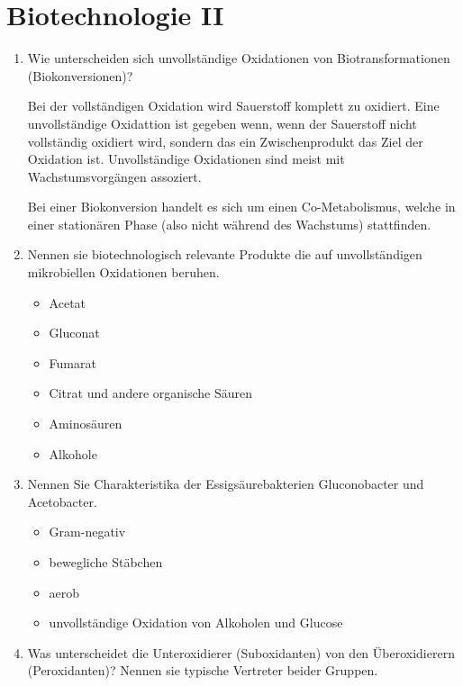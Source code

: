 
\section{Biotechnologie II}
\begin{enumerate}
	\item Wie unterscheiden sich unvollständige Oxidationen von Biotransformationen (Biokonversionen)?
		
		Bei der vollständigen Oxidation wird Sauerstoff komplett zu  oxidiert.
		Eine unvollständige Oxidattion ist gegeben wenn,
		wenn der Sauerstoff nicht vollständig oxidiert wird,
		sondern das ein Zwischenprodukt das Ziel der Oxidation ist.
		Unvollständige Oxidationen sind meist mit Wachstumsvorgängen assoziert.
		
		Bei einer Biokonversion handelt es sich um einen Co-Metabolismus,
		welche in einer stationären Phase (also nicht während des Wachstums) stattfinden.
		
	\item Nennen sie biotechnologisch relevante Produkte die auf unvollständigen mikrobiellen Oxidationen beruhen.
		
		\begin{itemize}
			\item Acetat
			\item Gluconat
			\item Fumarat
			\item Citrat und andere organische Säuren
			\item Aminosäuren
			\item Alkohole
		\end{itemize}
		
	\item Nennen Sie Charakteristika der Essigsäurebakterien Gluconobacter und Acetobacter.
	
		\begin{itemize}
			\item Gram-negativ
			\item bewegliche Stäbchen
			\item aerob
			\item unvollständige Oxidation von Alkoholen und Glucose
		\end{itemize}
			
	\item Was unterscheidet die Unteroxidierer (Suboxidanten) von den Überoxidierern (Peroxidanten)? Nennen sie typische Vertreter beider Gruppen.
	

\end{enumerate}
